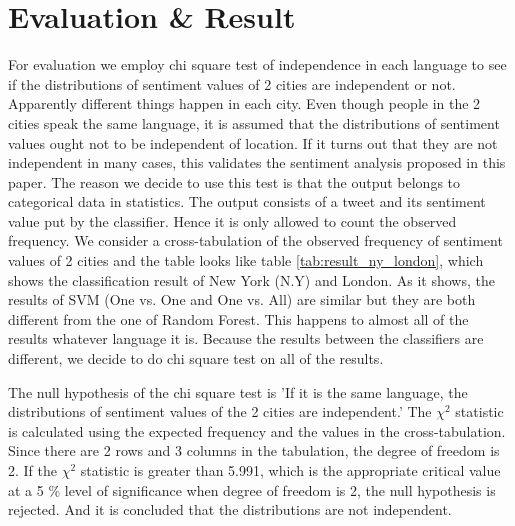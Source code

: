 \documentclass[twocolumn]{article}
\begin{document}
\section{Evaluation \& Result}
\vspace{-2mm}
For evaluation we employ chi square test of independence in each language to see if the distributions of sentiment values of 2 cities are independent or not. 
Apparently different things happen in each city.
Even though people in the 2 cities speak the same language, it is assumed that the distributions of sentiment values ought not to be independent of location.  
If it turns out that they are not independent in many cases, this validates the sentiment analysis proposed in this paper.
The reason we decide to use this test is that the output belongs to categorical data in statistics.
The output consists of a tweet and its sentiment value put by the classifier.
Hence it is only allowed to count the observed frequency.
We consider a cross-tabulation of the observed frequency of sentiment values of 2 cities and the table looks like table \ref{tab:result_ny_london}, which shows the classification result of New York (N.Y) and London.
As it shows, the results of SVM (One vs. One and One vs. All) are similar but they are both different from the one of Random Forest.
This happens to almost all of the results whatever language it is.
Because the results between the classifiers are different, we decide to do chi square test on all of the results.

The null hypothesis of the chi square test is 'If it is the same language, the distributions of sentiment values of the 2 cities are independent.'
The $\chi^2$ statistic is calculated using the expected frequency and the values in the cross-tabulation.
Since there are 2 rows and 3 columns in the tabulation, the degree of freedom is 2.
If the $\chi^2$ statistic is greater than 5.991, which is the appropriate critical value at a 5 \% level of significance when degree of freedom is 2, the null hypothesis is rejected.
And it is concluded that the distributions are not independent. 
\end{document}
